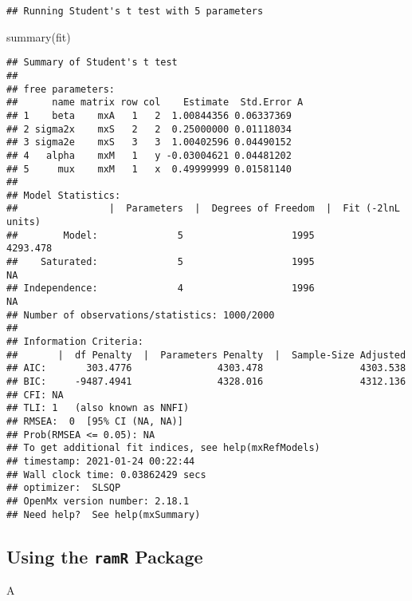 \documentclass[
]{book}
\newenvironment{Shaded}{\begin{snugshade}}{\end{snugshade}}
\newcommand{\FunctionTok}[1]{\textcolor[rgb]{0.00,0.00,0.00}{#1}}
\newcommand{\NormalTok}[1]{#1}
\theoremstyle{definition}
\theoremstyle{definition}
\theoremstyle{definition}
\theoremstyle{remark}
\begin{document}
\begin{verbatim}
## Running Student's t test with 5 parameters
\end{verbatim}

\begin{Shaded}
\begin{Highlighting}[]
\FunctionTok{summary}\NormalTok{(fit)}
\end{Highlighting}
\end{Shaded}

\begin{verbatim}
## Summary of Student's t test 
##  
## free parameters:
##      name matrix row col    Estimate  Std.Error A
## 1    beta    mxA   1   2  1.00844356 0.06337369  
## 2 sigma2x    mxS   2   2  0.25000000 0.01118034  
## 3 sigma2e    mxS   3   3  1.00402596 0.04490152  
## 4   alpha    mxM   1   y -0.03004621 0.04481202  
## 5     mux    mxM   1   x  0.49999999 0.01581140  
## 
## Model Statistics: 
##                |  Parameters  |  Degrees of Freedom  |  Fit (-2lnL units)
##        Model:              5                   1995              4293.478
##    Saturated:              5                   1995                    NA
## Independence:              4                   1996                    NA
## Number of observations/statistics: 1000/2000
## 
## Information Criteria: 
##       |  df Penalty  |  Parameters Penalty  |  Sample-Size Adjusted
## AIC:       303.4776               4303.478                 4303.538
## BIC:     -9487.4941               4328.016                 4312.136
## CFI: NA 
## TLI: 1   (also known as NNFI) 
## RMSEA:  0  [95% CI (NA, NA)]
## Prob(RMSEA <= 0.05): NA
## To get additional fit indices, see help(mxRefModels)
## timestamp: 2021-01-24 00:22:44 
## Wall clock time: 0.03862429 secs 
## optimizer:  SLSQP 
## OpenMx version number: 2.18.1 
## Need help?  See help(mxSummary)
\end{verbatim}

\hypertarget{using-the-ramr-package-1}{%
\subsection{\texorpdfstring{Using the \texttt{ramR} Package}{Using the ramR Package}}\label{using-the-ramr-package-1}}

\begin{Shaded}
\begin{Highlighting}[]
\NormalTok{A}
\end{Highlighting}
\end{Shaded}
\end{document}

